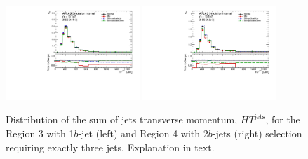 \begin{figure}[!htb]
\centering
\includegraphics[width=0.45\textwidth]{Plots/ttV/generator/c_Region_2_HT_jets}
\includegraphics[width=0.45\textwidth]{Plots/ttV/generator/c_Region_3_HT_jets}\\
  \caption{Distribution of the sum of jets transverse momentum, $HT^{\text{jets}}$, for the Region 3 with 1$b$-jet (left) and Region 4 with 2$b$-jets (right) selection requiring exactly three jets. Explanation in text. \label{ttV:den_3j12b}}
\end{figure}


